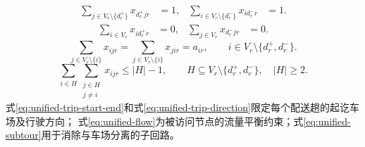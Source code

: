 \documentclass{setp-new}
\begin{document}
\begin{equation}
\begin{aligned}
\sum_{j\in V_r\setminus\{d_r^{+}\}}x_{d_r^{+}jr}&=1, &
\sum_{i\in V_r\setminus\{d_r^{-}\}}x_{id_r^{-}r}&=1 .
\end{aligned}
\label{eq:unified-trip-start-end}
\end{equation}
\begin{equation}
\begin{aligned}
\sum_{i\in V_r}x_{id_r^{+}r}&=0, &
\sum_{j\in V_r}x_{d_r^{-}jr}&=0 .
\end{aligned}
\label{eq:unified-trip-direction}
\end{equation}
\begin{equation}
\sum_{j\in V_r\setminus\{i\}}x_{ijr}
=\sum_{j\in V_r\setminus\{i\}}x_{jir}=a_{ir},
\qquad i\in V_r\setminus\{d_r^{+},d_r^{-}\}.
\label{eq:unified-flow}
\end{equation}
\begin{equation}
\sum_{i\in H}\sum_{\substack{j\in H\\j\ne i}}x_{ijr}
\le |H|-1,
\qquad H\subseteq V_r\setminus\{d_r^{+},d_r^{-}\},\quad |H|\ge2.
\label{eq:unified-subtour}
\end{equation}
式\eqref{eq:unified-trip-start-end}和式\eqref{eq:unified-trip-direction}限定每个配送趟的起讫车场及行驶方向；
式\eqref{eq:unified-flow}为被访问节点的流量平衡约束；式\eqref{eq:unified-subtour}用于消除与车场分离的子回路。
\end{document}
